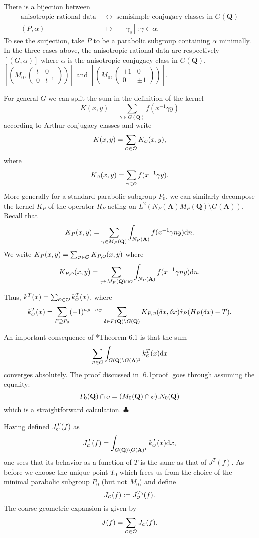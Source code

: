 \documentclass[11pt]{amsart}
\renewcommand\qedsymbol{$\clubsuit$}
\def\apg{a_{P} - a_{G}}
\def\A{\mathbf A}
\def\Q{\mathbf Q}
\def\O{\mathcal O}
\def\o{\scalebox{0.8}{$\scriptstyle\mathcal{O}$}}
\def\cb#1{{\color{blue}#1}}
\def\d{\text d}
\def\bs{\setminus} 			%
\def\Ltwo{L^2}
\theoremstyle{remark}
\begin{document}
There is a bijection between 
\begin{align*}
	\text{anisotropic rational data} \; & \leftrightarrow \; \text{semisimple conjugacy classes in } G(\Q) \\
	(P, \alpha) \quad & \mapsto \quad [\gamma_s] : \gamma \in \alpha.
\end{align*}
To see the surjection, take $P$ to be a parabolic subgroup containing $\alpha$ minimally. \cb{In the three cases above, the anisotropic rational data are respectively $[(G, \alpha)]$ where $\alpha$ is the anisotropic conjugacy class in $G(\Q)$, $[(M_0, \begin{pmatrix} t & 0 \\ 0 & t^{-1} \end{pmatrix})]$ and $[(M_0, \begin{pmatrix} \pm 1 & 0 \\ 0 & \pm 1 \end{pmatrix})]$. }

For general $G$ we can split the sum in the definition of the kernel
\[ K(x, y) = \sum_{\gamma \in G(\Q)} f(x^{-1} \gamma y) \]
according to Arthur-conjugacy classes and write
\[ K(x, y) = \sum_{\o \in \O} K_{\o}(x, y),\]
where
\[ K_{\o}(x, y) = \sum_{\gamma \in \o} f(x^{-1}\gamma y). \]
More generally for a standard parabolic subgroup $P_0$, we can similarly decompose the kernel $K_P$ of the operator $R_P$ acting on $\Ltwo(N_P(\A) M_P(\Q) \bs G(\A))$. Recall that
\[ K_P(x, y) = \sum_{\gamma \in M_P(\Q)} \int_{N_P(\A)} f(x^{-1} \gamma n y) \d n. \]
We write $K_P(x, y) = \sum_{\o \in \O} K_{P, \o} (x, y)$ where
\[ K_{P, \o}(x, y) = \sum_{\gamma \in M_P(\Q) \cap \o} \int_{N_P(\A)} f(x^{-1} \gamma n y) \d n. \]

Thus, $k^T(x) = \sum_{\o \in \O} k^T_{\o}(x)$, where
\[ k^T_{\o}(x) = \sum_{P \supseteq P_0} (-1)^{\apg} \sum_{\delta\in P(\Q)\bs G(\Q)} K_{P, \o}(\delta x, \delta x) \hat\tau_P(H_P(\delta x) - T). \]

An important consequence of \cite{clay}*{Theorem 6.1} is that the sum 
\begin{equation}
	\sum_{\o \in \O} \int_{G(\Q) \bs G(\A)^1} k_{\o}^T(x) \d x 
\end{equation}
converges absolutely. \cb{The proof discussed in \cref{6.1proof} goes through assuming the equality:
\[ P_0(\Q) \cap \o = (M_0(\Q) \cap \o).N_0(\Q) \]
which is a straightforward calculation. }
\qedsymbol

Having defined $J_{\o}^T(f)$ as
\[ J_{\o}^T(f) = \int_{G(\Q) \bs G(\A)^1} k_{\o}^T(x) \d x, \]
one sees that its behavior as a function of $T$ is the same as that of $J^T(f)$. As before we choose the unique point $T_0$ which frees us from the choice of the minimal parabolic subgroup $P_0$ (but not $M_0$) and define 
\[ J_{\o}(f) := J^{T_0}_{\o}(f). \]
The coarse geometric expansion is given by
\begin{equation} \label{coarse_geom}
	J(f) = \sum_{\o \in \O} J_{\o}(f). 
\end{equation}
\end{document}
